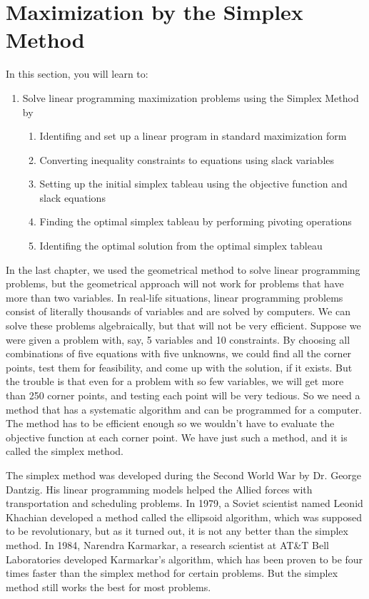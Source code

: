 \section{Maximization by the Simplex Method}\label{section_maximization_simplex}
In this section, you will learn to:
\begin{enumerate}
    \item Solve linear programming maximization problems using the Simplex Method by
          \begin{enumerate}
              \item Identifing and set up a linear program in standard maximization form
              \item Converting inequality constraints to equations using slack variables
              \item Setting up the initial simplex tableau using the objective function and slack equations
              \item Finding the optimal simplex tableau by performing pivoting operations
              \item Identifing the optimal solution from the optimal simplex tableau
          \end{enumerate}
\end{enumerate}

In the last chapter, we used the geometrical method to solve linear programming problems, but the geometrical approach will not work for problems that have more than two variables. In real-life situations, linear programming problems consist of literally thousands of variables and are solved by computers. We can solve these problems algebraically, but that will not be very efficient. Suppose we were given a problem with, say, 5 variables and 10 constraints. By choosing all combinations of five equations with five unknowns, we could find all the corner points, test them for feasibility, and come up with the solution, if it exists. But the trouble is that even for a problem with so few variables, we will get more than 250 corner points, and testing each point will be very tedious. So we need a method that has a systematic algorithm and can be programmed for a computer. The method has to be efficient enough so we wouldn't have to evaluate the objective function at each corner point. We have just such a method, and it is called the simplex method.

The simplex method was developed during the Second World War by Dr. George Dantzig. His linear programming models helped the Allied forces with transportation and scheduling problems. In 1979, a Soviet scientist named Leonid Khachian developed a method called the ellipsoid algorithm, which was supposed to be revolutionary, but as it turned out, it is not any better than the simplex method. In 1984, Narendra Karmarkar, a research scientist at AT\&T Bell Laboratories developed Karmarkar's algorithm, which has been proven to be four times faster than the simplex method for certain problems. But the simplex method still works the best for most problems.

